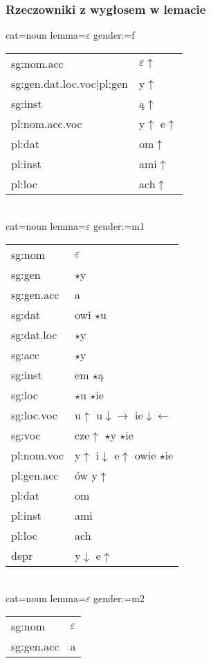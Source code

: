 \documentclass{beamer}
\begin{document}
\begin{frame}
\frametitle{Rzeczowniki z wygłosem w lemacie}
\vspace{-3mm}
\begin{scriptsize}
\begin{multicols}{2}
cat=noun lemma=$\varepsilon$ gender:=f\\
\begin{tabular}{l|l}
sg:nom.acc & $\varepsilon\uparrow$\\
sg:gen.dat.loc.voc|pl:gen & y$\uparrow$\\
sg:inst & ą$\uparrow$\\
pl:nom.acc.voc & y$\uparrow$ e$\uparrow$\\
pl:dat & om$\uparrow$\\
pl:inst & ami$\uparrow$\\
pl:loc & ach$\uparrow$\\
\end{tabular}\\
cat=noun lemma=$\varepsilon$ gender:=m1\\
\begin{tabular}{l|l}
sg:nom & $\varepsilon$\\
sg:gen & $\star$y\\
sg:gen.acc & a\\
sg:dat & owi $\star$u\\
sg:dat.loc & $\star$y\\
sg:acc & $\star$y\\
sg:inst & em $\star$ą\\
sg:loc & $\star$u $\star$ie\\
sg:loc.voc & u$\uparrow$ u$\downarrow\rightarrow$ ie$\downarrow\leftarrow$\\
sg:voc & cze$\uparrow$ $\star$y $\star$ie\\
pl:nom.voc & y$\uparrow$ i$\downarrow$ e$\uparrow$ owie $\star$ie\\
pl:gen.acc & ów y$\uparrow$\\
pl:dat & om\\
pl:inst & ami\\
pl:loc & ach\\
depr & y$\downarrow$ e$\uparrow$\\
\end{tabular}\\
cat=noun lemma=$\varepsilon$ gender:=m2\\
\begin{tabular}{l|l}
sg:nom & $\varepsilon$\\
sg:gen.acc & a\\

\end{tabular}
\end{multicols}
\end{scriptsize}
\end{frame}
\end{document}

